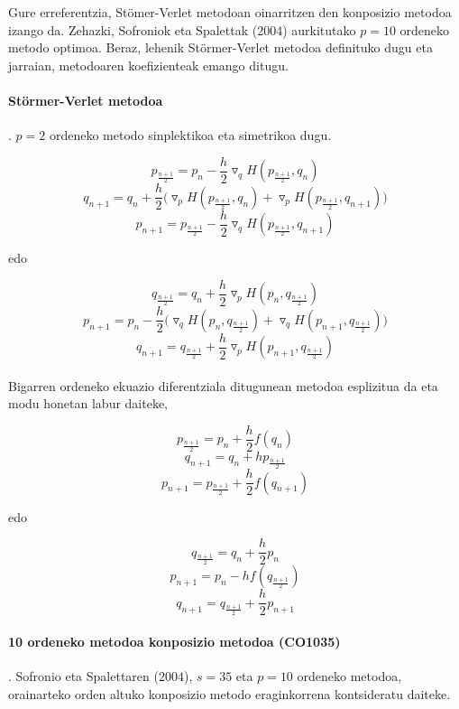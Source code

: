 Gure erreferentzia, Stömer-Verlet metodoan oinarritzen den konposizio metodoa izango da. Zehazki, Sofroniok eta Spalettak ($2004$) aurkitutako $p=10$ ordeneko metodo optimoa. Beraz, lehenik Störmer-Verlet metodoa definituko dugu eta jarraian, metodoaren koefizienteak emango ditugu.   

\paragraph*{\textbf{Störmer-Verlet  metodoa}}.
$p=2$ ordeneko metodo sinplektikoa eta simetrikoa dugu.

\[p_{\frac{n+1}{2}}=p_n-\frac{h}{2} \triangledown_q H(p_{\frac{n+1}{2}},q_n) \]
\begin{equation}
q_{n+1}=q_n+\frac{h}{2} \big(\triangledown_p H(p_{\frac{n+1}{2}},q_n)+ \triangledown_p H(p_{\frac{n+1}{2}},q_{n+1}) \big)
\end{equation}
\[p_{n+1}=p_{\frac{n+1}{2}}-\frac{h}{2} \triangledown_q H(p_{\frac{n+1}{2}},q_{n+1}) \]

edo

\[q_{\frac{n+1}{2}}=q_n+\frac{h}{2} \triangledown_p H(p_n,q_{\frac{n+1}{2}}) \]
\begin{equation}
p_{n+1}=p_n-\frac{h}{2} \big(\triangledown_q H(p_n,q_{\frac{n+1}{2}})+ \triangledown_q H(p_{n+1},q_{\frac{n+1}{2}}) \big)
\end{equation}
\[q_{n+1}=q_{\frac{n+1}{2}}+\frac{h}{2} \triangledown_p H(p_{n+1},q_{\frac{n+1}{2}}) \]


\paragraph*{}Bigarren ordeneko ekuazio diferentziala ditugunean metodoa esplizitua da eta modu honetan labur daiteke,

\[p_{\frac{n+1}{2}}=p_n+\frac{h}{2} f(q_n)\]
\begin{equation}
q_{n+1}=q_n+h p_{\frac{n+1}{2}}
\end{equation}
\[p_{n+1}=p_{\frac{n+1}{2}}+\frac{h}{2}f(q_{n+1})\]

edo

\[q_{\frac{n+1}{2}}=q_n+\frac{h}{2} p_n\]
\begin{equation}
p_{n+1}=p_n-h f(q_{\frac{n+1}{2}})
\end{equation}
\[q_{n+1}=q_{\frac{n+1}{2}}+\frac{h}{2} p_{n+1}\]


\paragraph*{\textbf{10 ordeneko metodoa konposizio metodoa (CO1035)}}.
Sofronio eta Spalettaren ($2004$), $s=35$ eta $p=10$ ordeneko metodoa, orainarteko orden altuko konposizio metodo eraginkorrena kontsideratu daiteke.

